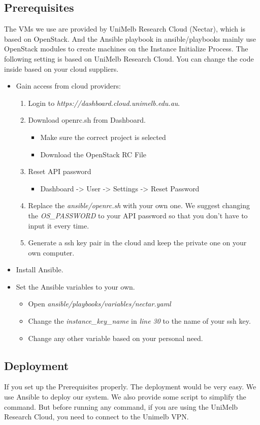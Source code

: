 \documentclass{article}
\begin{document}
\subsection{Prerequisites}
The VMs we use are provided by UniMelb Research Cloud (Nectar), which is based on OpenStack. And the Ansible playbook in ansible/playbooks mainly use OpenStack modules to create machines on the Instance Initialize Process. The following setting is based on UniMelb Research Cloud. You can change the code inside based on your cloud suppliers.
\begin{itemize}
	\item Gain access from cloud providers:
	\begin{enumerate}
		\item Login to \textit{https://dashboard.cloud.unimelb.edu.au}.
		\item Download openrc.sh from Dashboard.
		\begin{itemize}
			\item Make sure the correct project is selected
			\item Download the OpenStack RC File
		\end{itemize}
		\item Reset API password
		\begin{itemize}
			\item Dashboard -> User -> Settings -> Reset Password
		\end{itemize}
	    \item Replace the \textit{ansible/openrc.sh} with your own one. We suggest changing the \textit{OS\_PASSWORD} to your API password so that you don't have to input it every time.
	    \item Generate a ssh key pair in the cloud and keep the private one on your own computer.
	\end{enumerate}
	\item Install Ansible.
	\item Set the Ansible variables to your own.
	\begin{itemize}
		\item Open \textit{ansible/playbooks/variables/nectar.yaml}
		\item Change the \textit{instance\_key\_name} in \textit{line 30} to the name of your ssh key.
		\item Change any other variable based on your personal need.
	\end{itemize}
\end{itemize}
\subsection{Deployment}
If you set up the Prerequisites properly. The deployment would be very easy. We use Ansible to deploy our system. We also provide some script to simplify the command. But before running any command, if you are using the UniMelb Research Cloud, you need to connect to the Unimelb VPN.
\end{document}

